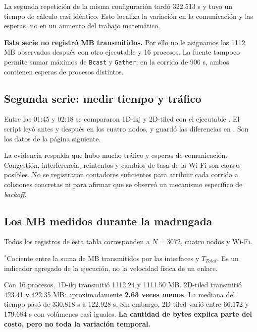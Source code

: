 La segunda repetición de la misma configuración tardó 322.513 s y tuvo un tiempo de cálculo casi idéntico. Esto localiza la variación en la comunicación y las esperas, no en un aumento del trabajo matemático.

\textbf{Esta serie no registró MB transmitidos.} Por ello no le asignamos los 1112 MB observados después con otro ejecutable y 16 procesos. La fuente tampoco permite sumar máximos de \texttt{Bcast} y \texttt{Gather}: en la corrida de 906 s, ambos contienen esperas de procesos distintos.

\subsection{Segunda serie: medir tiempo y tráfico}
Entre las 01:45 y 02:18 se compararon 1D-ikj y 2D-tiled con el ejecutable . El script leyó  antes y después en los cuatro nodos, y guardó las diferencias en . Son los datos de la página siguiente.

\begin{idea}
La evidencia respalda que hubo mucho tráfico y esperas de comunicación. Congestión, interferencia, reintentos y cambios de tasa de la Wi-Fi son causas posibles. No se registraron contadores suficientes para atribuir cada corrida a colisiones concretas ni para afirmar que se observó un mecanismo específico de \emph{backoff}.
\end{idea}

\clearpage
\subsection{Los MB medidos durante la madrugada}
Todos los registros de esta tabla corresponden a $N=3072$, cuatro nodos y Wi-Fi.

{\small $^{*}$Cociente entre la suma de MB transmitidos por las interfaces y $T_{Total}$. Es un indicador agregado de la ejecución, no la velocidad física de un enlace.}


Con 16 procesos, 1D-ikj transmitió 1112.24 y 1111.50 MB. 2D-tiled transmitió 423.41 y 422.35 MB: aproximadamente \textbf{2.63 veces menos}. La mediana del tiempo pasó de 330.818 s a 122.928 s. Sin embargo, 2D-tiled varió entre 66.172 y 179.684 s con volúmenes casi iguales. \textbf{La cantidad de bytes explica parte del costo, pero no toda la variación temporal.}

